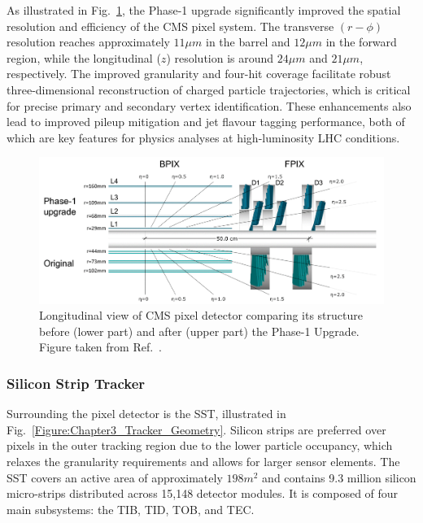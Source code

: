 As illustrated in Fig.~\ref{Figure:Chapter3_Pixel_Upgrade}, the Phase-1 upgrade significantly improved the spatial resolution and efficiency of the CMS pixel system. The transverse $(r-\phi)$ resolution reaches approximately $11\unit{\mu m}$ in the barrel and $12\unit{\mu m}$ in the forward region, while the longitudinal ($z$) resolution is around $24\unit{\mu m}$ and $21\unit{\mu m}$, respectively. The improved granularity and four-hit coverage facilitate robust three-dimensional reconstruction of charged particle trajectories, which is critical for precise primary and secondary vertex identification. These enhancements also lead to improved pileup mitigation and jet flavour tagging performance, both of which are key features for physics analyses at high-luminosity LHC conditions.

\begin{figure}[h]
\centering
\includegraphics[width= 1\textwidth]{Figures/Chapter3/CMS_Pixel_Upgrade.pdf}
\caption{Longitudinal view of CMS pixel detector comparing its structure before (lower part) and after (upper part) the Phase-1 Upgrade. Figure taken from Ref.~\cite{LHC_Run3}.}
\label{Figure:Chapter3_Pixel_Upgrade}
\end{figure}

\subsubsection{Silicon Strip Tracker}

Surrounding the pixel detector is the \ac{SST}, illustrated in Fig.~\ref{Figure:Chapter3_Tracker_Geometry}. Silicon strips are preferred over pixels in the outer tracking region due to the lower particle occupancy, which relaxes the granularity requirements and allows for larger sensor elements. The SST covers an active area of approximately $198\unit{m}^2$ and contains 9.3 million silicon micro-strips distributed across 15,148 detector modules. It is composed of four main subsystems: the \ac{TIB}, \ac{TID}, \ac{TOB}, and \ac{TEC}.

